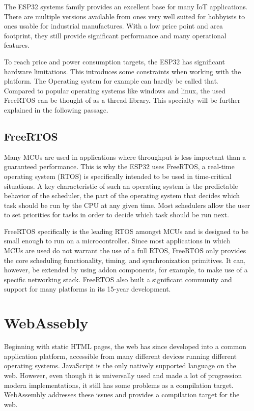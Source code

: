 The ESP32 systems family provides an excellent base for many IoT applications. There are multiple versions available from ones very well suited for hobbyists to ones usable for industrial manufactures. With a low price point and area footprint, they still provide significant performance and many operational features.

To reach price and power consumption targets, the ESP32 has significant hardware limitations. This introduces some constraints when working with the platform. The Operating system for example can hardly be called that. Compared to popular operating systems like windows and linux, the used FreeRTOS can be thought of as a thread library. This specialty will be further explained in the following passage.
\subsection{FreeRTOS}
Many MCUs are used in applications where throughput is less important than a guaranteed performance. This is why the ESP32 uses FreeRTOS, a real-time operating system (RTOS) is specifically intended to be used in time-critical situations. A key characteristic of such an operating system is the predictable behavior of the scheduler, the part of the operating system that decides which task should be run by the CPU at any given time. Most schedulers allow the user to set priorities for tasks in order to decide which task should be run next.

FreeRTOS specifically is the leading RTOS amongst MCUs and is designed to be small enough to run on a microcontroller. Since most applications in which MCUs are used do not warrant the use of a full RTOS, FreeRTOS only provides the core scheduling functionality, timing, and synchronization primitives. It can, however, be extended by using addon components, for example, to make use of a specific networking stack. FreeRTOS also built a significant community and support for many platforms in its 15-year development.
\section{WebAssebly}
Beginning with static HTML pages, the web has since developed into a common application platform, accessible from many different devices running different operating systems. JavaScript is the only natively supported language on the web. However, even though it is universally used and made a lot of progression modern implementations, it still has some problems as a compilation target. WebAssembly addresses these issues and provides a compilation target for the web.

